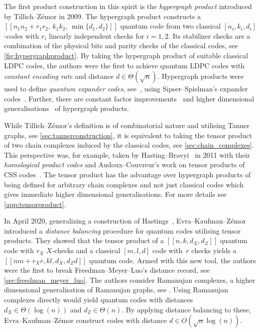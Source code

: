 \documentclass[amsmath, amssymb, floatfix, reprint, twocolumn, notitlepage, 10pt]{revtex4-1}
\begin{document}
The first product construction in this spirit is the \emph{hypergraph product} introduced by Tillich--Z\'emor \cite{tillich2013quantum} in 2009.
The hypergraph product constructs a $[[n_1 n_2 + r_1 r_2,\, k_1 k_2,\, \min \lbrace d_1, d_2 \rbrace]]$ quantum code from two classical $[n_i,k_i,d_i]$-codes with $r_i$ linearly independent checks for $i=1,2$. Its stabilizer checks are a combination of the physical bits and parity checks of the classical codes, see \cref{fig:hypergraphproduct}.
By taking the hypergraph product of suitable classical LDPC codes, the authors were the first to achieve quantum LDPC codes with \emph{constant encoding rate} and distance $d\in\Theta(\sqrt{n}).$
Hypergraph products were used to define \emph{quantum expander codes}, see~\cite{leverrier_quantum_2015, fawzi_constant_2018}, using Sipser--Spielman's expander codes~\cite{sipser_expander_1996}. 
Further, there are constant factor improvements~\cite{kovalev_improved_2012} and higher dimensional generalisations~\cite{zeng_higher-dimensional_2019} of hypergraph products.

While Tillich--Z\'emor's definition is of combinatorial nature and utilising Tanner graphs, see \cref{sec:tannerconstruction}, it is equivalent to taking the tensor product of two chain complexes induced by the classical codes, see \cref{sec:chain_complexes}.
This perspective was, for example, taken by Hasting--Bravyi~\cite{bravyi2014homological} in 2011 with their \emph{homological product codes} and Audoux--Couvreur's work on tensor products of CSS codes~\cite{audoux_tensor_2019}. The tensor product has the advantage over hypergraph products of being defined for arbitrary chain complexes and not just classical codes which gives immediate higher dimensional generalisations. For more details see \cref{app:tensorproduct}.

In April 2020, generalizing a construction of Hastings~\cite{hastings2016weight}, Evra--Kaufman--Zémor~\cite{evra_decodable_2020} introduced a \emph{distance balancing} procedure for quantum codes utilising tensor products. They showed that the tensor product of a $[[n,k,d_X,d_Z]]$ quantum code with $r_X$ $X$-checks and a classical $[m,l,d]$  code with~$r$ checks yields a $[[nm+r_Xr,kl, d_X, d_Zd]]$ quantum code.
Armed with this new tool, the authors were the first to break Freedman--Meyer--Luo's distance record, see \cref{sec:freedman_meyer_luo}. 
The authors consider Ramanujan complexes, a higher dimensional generalisation of Ramanujan graphs, see \cite{lubotzky_high_2017}. 
Using Ramanujan complexes directly would yield quantum codes with distances $d_X\in \Theta(\log(n))$ and $d_Z\in \Theta(n).$
By applying distance balancing to these, Evra--Kaufman--Zémor construct codes with distance $d\in O(\sqrt{n}\log(n)).$
\end{document}
